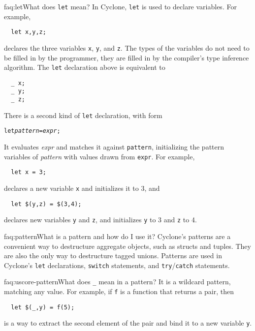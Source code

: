 \begin{faqa}{faq:let}{What does \texttt{let} mean?}
In Cyclone, \texttt{let} is used to declare variables.  For example,
\begin{verbatim}
  let x,y,z;
\end{verbatim}
declares the three variables \texttt{x}, \texttt{y}, and \texttt{z}.
The types of the variables do not need to be filled in by the
programmer, they are filled in by the compiler's type inference
algorithm.  The \texttt{let} declaration above is equivalent to
\begin{verbatim}
  _ x;
  _ y;
  _ z;
\end{verbatim}

There is a second kind of \texttt{let} declaration, with form
\begin{alltt}
  let {\it pattern} = {\it expr};
\end{alltt}
It evaluates \textit{expr} and matches it against \texttt{pattern},
initializing the pattern variables of \textit{pattern} with values
drawn from \texttt{expr}.  For example,
\begin{verbatim}
  let x = 3;
\end{verbatim}
declares a new variable \texttt{x} and initializes it to 3, and
\begin{verbatim}
  let $(y,z) = $(3,4);
\end{verbatim}
declares new variables \texttt{y} and \texttt{z}, and initializes
\texttt{y} to 3 and \texttt{z} to 4.
\end{faqa}

\begin{faqa}{faq:pattern}{What is a pattern and how do I use it?}
Cyclone's patterns are a convenient way to destructure aggregate
objects, such as structs and tuples.  They are also the only way to
destructure tagged unions.  Patterns are used in Cyclone's
\texttt{let} declarations, \texttt{switch} statements, and
\texttt{try}/\texttt{catch} statements.
\end{faqa}

\begin{faqa}{faq:uscore-pattern}{What does \texttt{_} mean in a pattern?}
It is a wildcard pattern, matching any value.  For example, if
\texttt{f} is a function that returns a pair, then
\begin{verbatim}
  let $(_,y) = f(5); 
\end{verbatim} %
is a way to extract the second element of the pair and bind it to a
new variable \texttt{y}.
\end{faqa}

